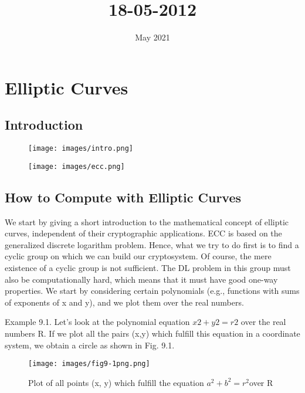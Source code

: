 \documentclass{article}
\title{18-05-2012}
\date{May 2021}
\begin{document}
\maketitle

\section{Elliptic Curves}
\subsection{Introduction}
\begin{figure}[h]
	\begin{center}
  		\texttt{[image: images/intro.png]}
 	\end{center}
 	\label{init}
\end{figure}

\begin{figure}[h]
	\begin{center}
  		\texttt{[image: images/ecc.png]}
 	\end{center}
 	\label{init}
\end{figure}

\subsection{How to Compute with Elliptic Curves}
We start by giving a short introduction to the mathematical concept of elliptic
curves, independent of their cryptographic applications. ECC is based on the generalized
discrete logarithm problem. Hence, what we try to do first is to find a cyclic group on which we can build our cryptosystem. Of course, the mere existence of a
cyclic group is not sufficient. The DL problem in this group must also be computationally
hard, which means that it must have good one-way properties.
We start by considering certain polynomials (e.g., functions with sums of exponents
of x and y), and we plot them over the real numbers.

Example 9.1. Let’s look at the polynomial equation ${x2+y2 = r2}$ over the real numbers
R. If we plot all the pairs (x,y) which fulfill this equation in a coordinate system, we obtain a circle as shown in Fig. 9.1.

\begin{figure}[h]
	\begin{center}
  		\texttt{[image: images/fig9-1png.png]}
  		\caption{Plot of all points (x, y) which fulfill the equation ${a^2 + b^2 = r^2 }$over R }
 	\end{center}
 	\label{init}
\end{figure}
\end{document}
